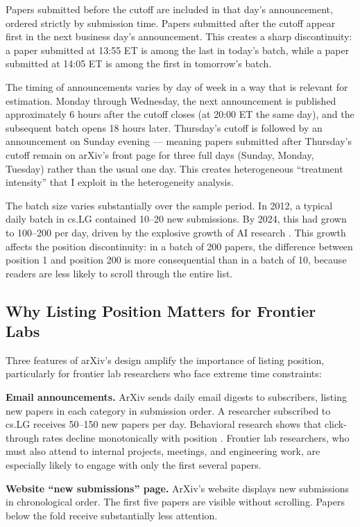 \documentclass[12pt]{article}
\begin{document}
Papers submitted before the cutoff are included in that day's announcement, ordered strictly by submission time. Papers submitted after the cutoff appear first in the next business day's announcement. This creates a sharp discontinuity: a paper submitted at 13:55 ET is among the last in today's batch, while a paper submitted at 14:05 ET is among the first in tomorrow's batch.

The timing of announcements varies by day of week in a way that is relevant for estimation. Monday through Wednesday, the next announcement is published approximately 6 hours after the cutoff closes (at 20:00 ET the same day), and the subsequent batch opens 18 hours later. Thursday's cutoff is followed by an announcement on Sunday evening --- meaning papers submitted after Thursday's cutoff remain on arXiv's front page for three full days (Sunday, Monday, Tuesday) rather than the usual one day. This creates heterogeneous ``treatment intensity'' that I exploit in the heterogeneity analysis.

The batch size varies substantially over the sample period. In 2012, a typical daily batch in cs.LG contained 10--20 new submissions. By 2024, this had grown to 100--200 per day, driven by the explosive growth of AI research \citep{klinger2020}. This growth affects the position discontinuity: in a batch of 200 papers, the difference between position 1 and position 200 is more consequential than in a batch of 10, because readers are less likely to scroll through the entire list.

\subsection{Why Listing Position Matters for Frontier Labs}

Three features of arXiv's design amplify the importance of listing position, particularly for frontier lab researchers who face extreme time constraints:

\textbf{Email announcements.} ArXiv sends daily email digests to subscribers, listing new papers in each category in submission order. A researcher subscribed to cs.LG receives 50--150 new papers per day. Behavioral research shows that click-through rates decline monotonically with position \citep{feenberg2017}. Frontier lab researchers, who must also attend to internal projects, meetings, and engineering work, are especially likely to engage with only the first several papers.

\textbf{Website ``new submissions'' page.} ArXiv's website displays new submissions in chronological order. The first five papers are visible without scrolling. Papers below the fold receive substantially less attention.
\end{document}
